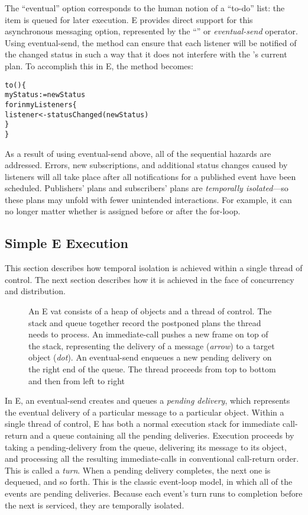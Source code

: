 \documentclass{llncs}
\begin{document}
The ``eventual'' option corresponds to the human notion of a ``to-do''
list: the item is queued for later execution. E provides direct
support for this asynchronous messaging option, represented by the
``\code{<-}'' or \emph{eventual-send} operator. Using eventual-send,
the  method can ensure that each listener will be
notified of the changed status in such a way that it does not
interfere with the 's current plan.  To accomplish
this in E, the  method becomes:
%
\begin{alltt}
    to () \{
        myStatus := newStatus
        for  in myListeners \{
            listener <- statusChanged(newStatus)
        \}
    \}
\end{alltt}
%
As a result of using eventual-send above, all of the sequential
hazards are addressed. Errors, new subscriptions, and additional
status changes caused by listeners will all take place after all
notifications for a published event have been scheduled.  Publishers'
plans and subscribers' plans are \emph{temporally isolated}---so these
plans may unfold with fewer unintended interactions. For example, it
can no longer matter whether  is assigned before or
after the for-loop.

\subsection{Simple E Execution}

This section describes how temporal isolation is achieved within a
single thread of control.  The next section describes how it is
achieved in the face of concurrency and distribution.

\begin{figure}
\centerline{}
\caption{An E vat consists of a heap of objects and a thread of
  control. The stack and queue together record the postponed plans the
  thread needs to process. An immediate-call pushes a new frame on top
  of the stack, representing the delivery of a message ({\it arrow})
  to a target object ({\it dot}). An eventual-send enqueues a new
  pending delivery on the right end of the queue. The thread proceeds
  from top to bottom and then from left to right}
\label{fig:stackvat}
\end{figure}

In E, an eventual-send creates and queues a \emph{pending delivery},
which represents the eventual delivery of a particular message to a
particular object.  Within a single thread of control, E has both a
normal execution stack for immediate call-return and a queue
containing all the pending deliveries. Execution proceeds by taking a
pending-delivery from the queue, delivering its message to its object,
and processing all the resulting immediate-calls in conventional
call-return order.  This is called a \emph{turn}.  When a pending
delivery completes, the next one is dequeued, and so forth.  This is
the classic event-loop model, in which all of the events are pending
deliveries. Because each event's turn runs to completion before the
next is serviced, they are temporally isolated.
\end{document}

